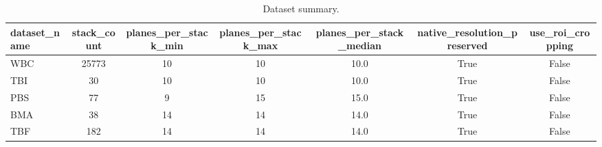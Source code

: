 \begin{table}[t]
\centering
\caption{Dataset summary.}
\begin{tabular}{lcccccc}
\hline
dataset_name & stack_count & planes_per_stack_min & planes_per_stack_max & planes_per_stack_median & native_resolution_preserved & use_roi_cropping \\
\hline
WBC & 25773 & 10 & 10 & 10.0 & True & False \\
TBI & 30 & 10 & 10 & 10.0 & True & False \\
PBS & 77 & 9 & 15 & 15.0 & True & False \\
BMA & 38 & 14 & 14 & 14.0 & True & False \\
TBF & 182 & 14 & 14 & 14.0 & True & False \\
\hline
\end{tabular}
\end{table}
